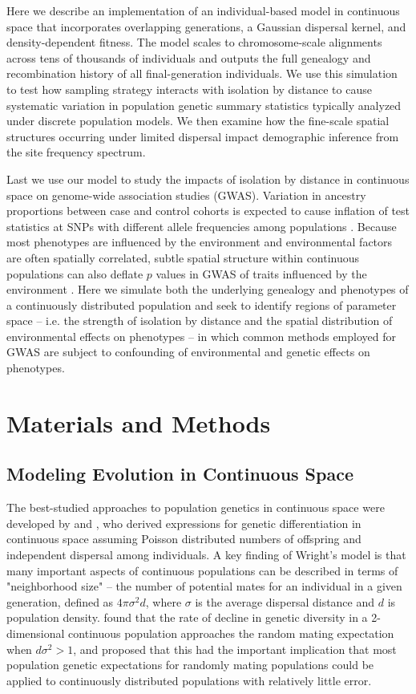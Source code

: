 \documentclass[11pt,twoside,lineno]{preprint}
\begin{document}
Here we describe an implementation of an individual-based model in continuous space that incorporates overlapping generations, a Gaussian dispersal kernel, and density-dependent fitness. The model scales to chromosome-scale alignments across tens of thousands of individuals and outputs the full genealogy and recombination history of all final-generation individuals. We use this simulation to test how sampling strategy interacts with isolation by distance to cause systematic variation in population genetic summary statistics typically analyzed under discrete population models. We then examine how the fine-scale spatial structures occurring under limited dispersal impact demographic inference from the site frequency spectrum.

Last we use our model to study the impacts of isolation by distance in continuous space on genome-wide association studies (GWAS). Variation in ancestry proportions between case and control cohorts is expected to cause inflation of test statistics at SNPs with different allele frequencies among populations \citep{Price2006}. Because most phenotypes are influenced by the environment and environmental factors are often spatially correlated, subtle spatial structure within continuous populations can also deflate $p$ values in GWAS of traits influenced by the environment \citep{Mathieson2012}. Here we simulate both the underlying genealogy and phenotypes of a continuously distributed population and seek to identify regions of parameter space -- i.e. the strength of isolation by distance and the spatial distribution of environmental effects on phenotypes -- in which common methods employed for GWAS are subject to confounding of environmental and genetic effects on phenotypes. 

\section{Materials and Methods}
\label{sec:materials:methods}

\subsection{Modeling Evolution in Continuous Space}
The best-studied approaches to population genetics in continuous space were developed by \cite{Wright1942,Wright1943} and \cite{Malecot1948}, who derived expressions for genetic differentiation in continuous space assuming Poisson distributed numbers of offspring and independent dispersal among individuals. A key finding of Wright's model is that many important aspects of continuous populations can be described in terms of "neighborhood size" -- the number of potential mates for an individual in a given generation, defined as $4\pi\sigma^2d$, where $\sigma$ is the average dispersal distance and $d$ is population density. \cite{Maruyama1972} found that the rate of decline in genetic diversity in a 2-dimensional continuous population approaches the random mating expectation when $d\sigma^2 > 1$, and proposed that this had the important implication that most population genetic expectations for randomly mating populations could be applied to continuously distributed populations with relatively little error. 
\end{document}
